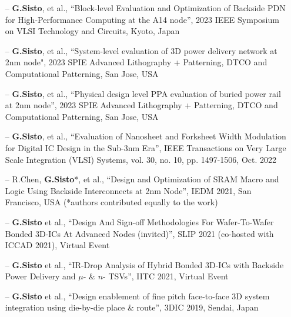 \documentclass[10pt,a4paper,fancychapters]{altacv}
\begin{document}
\newpage
\begin{fullwidth}
\begin{itemize}
    \setlength{\itemindent}{0.5em}
    \item[--] \small{\textbf{G.Sisto},  et al., ``Block-level Evaluation and Optimization of Backside PDN for
    High-Performance Computing at the A14 node'', 2023 IEEE Symposium on VLSI Technology and Circuits, Kyoto, Japan} 
    \item[--] \small{\textbf{G.Sisto},  et al., ``System-level evaluation of 3D power delivery network at 2nm node", 2023 SPIE Advanced Lithography + Patterning, DTCO and Computational Patterning, San Jose, USA} 
    \item[--] \small{\textbf{G.Sisto},  et al., ``Physical design level PPA evaluation of buried power rail at 2nm
    node'', 2023 SPIE Advanced Lithography + Patterning, DTCO and Computational Patterning, San Jose, USA} 
    \item[--] \small{\textbf{G.Sisto},  et al., ``Evaluation of Nanosheet and Forksheet Width Modulation for Digital IC
    Design in the Sub-3nm Era'', IEEE Transactions on Very Large Scale Integration (VLSI) Systems, vol. 30, no. 10, pp.
    1497-1506, Oct. 2022} 
    \item[--] \small{R.Chen, \textbf{G.Sisto}*,  et al., ``Design and Optimization of SRAM Macro and Logic Using Backside
    Interconnects at 2nm Node'', IEDM 2021, San Francisco, USA (*authors contributed equally to the work)} 
    \item[--] \small{\textbf{G.Sisto}  et al., ``Design And Sign-off Methodologies For
    Wafer-To-Wafer Bonded 3D-ICs At Advanced Nodes (invited)'', SLIP 2021 (co-hosted with ICCAD 2021), Virtual Event}
    \item[--] \small{\textbf{G.Sisto} et al., ``IR-Drop Analysis of Hybrid Bonded 3D-ICs with Backside Power Delivery
    and $\mu$- \& $n$- TSVs'', IITC 2021, Virtual Event} 
    \item[--] \small{\textbf{G.Sisto} et al., ``Design enablement of fine pitch face-to-face 3D system integration using die-by-die place \& route'', 3DIC 2019, Sendai, Japan}
\end{itemize}
\end{fullwidth}
\end{document}
